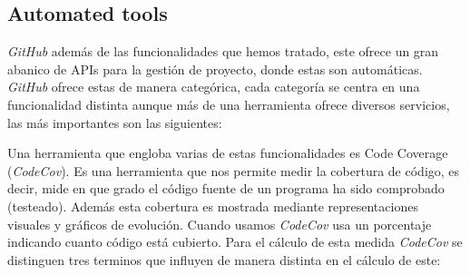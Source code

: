 \documentclass[a4paper, 12pt]{book}
\begin{document}
\subsection{Automated tools}
\label{subsec:autotools}
\emph{GitHub} además de las funcionalidades que hemos tratado, este ofrece un gran abanico de APIs para la gestión de proyecto, donde estas son automáticas. \emph{GitHub} ofrece estas de manera categórica, cada categoría se centra en una funcionalidad distinta aunque más de una herramienta ofrece diversos servicios, las más importantes son las siguientes:
\begin{table}[H]
    \centering
    \caption{Categorías de herramientas para la gestión de proyectos en \emph{GitHub}}
    \label{tab:cagGitHub}
\end{table}
Una herramienta que engloba varias de estas funcionalidades es Code Coverage (\emph{CodeCov}). Es una herramienta que nos permite medir la cobertura de código, es decir, mide en que grado el código fuente de un programa ha sido comprobado (testeado). Además esta cobertura es mostrada mediante representaciones visuales y gráficos de evolución. Cuando usamos \emph{CodeCov} usa un porcentaje indicando cuanto código está cubierto. Para el cálculo de esta medida \emph{CodeCov} se distinguen tres terminos que influyen de manera distinta en el cálculo de este:
\end{document}
